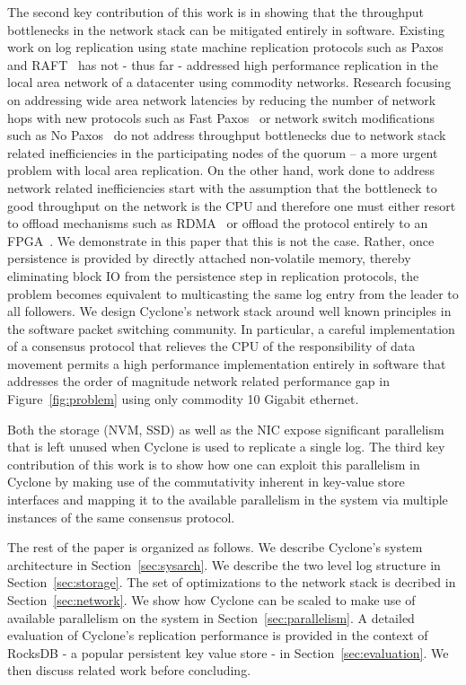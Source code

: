 \documentclass[pageno]{jpaper}
\begin{document}
The second key contribution of this work is in showing that the throughput
bottlenecks in the network stack can be mitigated entirely in software. Existing
work on log replication using state machine replication protocols such as
Paxos~\cite{paxos} and RAFT~\cite{raft} has not - thus far - addressed high
performance replication in the local area network of a datacenter using
commodity networks.  Research focusing on addressing wide area network latencies
by reducing the number of network hops with new protocols such as Fast
Paxos~\cite{fast-paxos} or network switch modifications such as No
Paxos~\cite{nopaxos} do not address throughput bottlenecks due to network stack
related inefficiencies in the participating nodes of the quorum -- a more urgent
problem with local area replication. On the other hand, work done to address
network related inefficiencies start with the assumption that the bottleneck to
good throughput on the network is the CPU and therefore one must either resort
to offload mechanisms such as RDMA~\cite{dare, farm, faast} or offload the
protocol entirely to an FPGA~\cite{consensus_box}. We demonstrate in this paper
that this is not the case. Rather, once persistence is provided by directly
attached non-volatile memory, thereby eliminating block IO from the persistence 
step in
replication protocols, the problem becomes equivalent to multicasting the same
log entry from the leader to all followers. We design Cyclone's network stack
around well known principles in the software packet switching community. In
particular, a careful implementation of a consensus protocol that relieves the
CPU of the responsibility of data movement permits a high performance
implementation entirely in software that addresses the order of magnitude
network related performance gap in Figure~\ref{fig:problem} using only commodity
10 Gigabit ethernet.

Both the storage (NVM, SSD) as well as the NIC expose significant parallelism
that is left unused when Cyclone is used to replicate a single log. The third
key contribution of this work is to show how one can exploit this parallelism in
Cyclone by making use of the commutativity inherent in key-value store
interfaces and mapping it to the available parallelism in the system via
multiple instances of the same consensus protocol.

The rest of the paper is organized as follows. We describe Cyclone's system
architecture in Section~\ref{sec:sysarch}. We describe the two level log
structure in Section~\ref{sec:storage}. The set of optimizations to the network
stack is decribed in Section~\ref{sec:network}. We show how Cyclone can be
scaled to make use of available parallelism on the system in
Section~\ref{sec:parallelism}. A detailed evaluation of Cyclone's replication
performance is provided in the context of RocksDB - a popular persistent key
value store - in Section~\ref{sec:evaluation}. We then discuss related work
before concluding.
\end{document}
